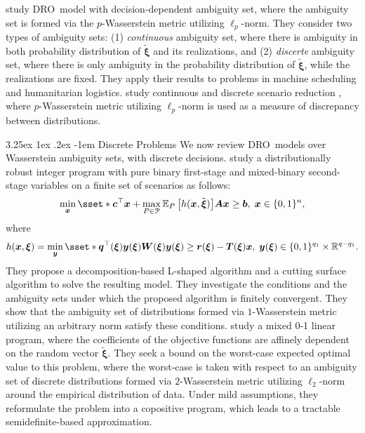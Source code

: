 \documentclass[final,onefignum,onetabnum]{class}
\makeatletter
\renewcommand\paragraph{\@startsection{paragraph}{4}{\z@}%
  {3.25ex \@plus1ex \@minus.2ex}%
  {-1em}%
  {\normalfont\normalsize\bfseries}}
\newcommand{\ee}[2]{\mathbb{E}_{#1} \left[ #2 \right]}
\newcommand{\bs}[1]{\boldsymbol{#1}} %
\newcommand{\Bs}[1]{\mathbb{#1}} %
\newcommand{\Cs}[1]{\mathcal{#1}} %
\newcommand{\txi}{\tilde{\bs{\xi}}}
\newcommand{\dro}{DRO}
\makeatother
\begin{document}
\citet{noyan2018} study \dro\ model with decision-dependent ambiguity set, where the ambiguity set is formed via the $p$-Wasserstein metric utilizing $\ell_{p}$-norm. They consider two types of ambiguity sets: (1) {\it continuous} ambiguity set, where there is ambiguity in both probability distribution of $\txi$ and its realizations, and (2) {\it discerte} ambiguity set, where there is only ambiguity in the probability distribution of $\txi$, while the realizations are fixed.
They apply their results to problems in machine scheduling and humanitarian logistics. 
\citet{rujeerapaiboon2018reduction} study continuous and discrete scenario reduction \citep{dupavcova2003scenario,heitsch2003scenario,heitsch2009modeling,heitsch2009reduction,arpon2018}, where  
$p$-Wasserstein metric utilizing $\ell_{p}$-norm is used as a measure of discrepancy between distributions.


\paragraph{Discrete Problems}
We now review \dro\ models over Wasserstein ambiguity sets, with discrete decisions. 
\citet{bansal2018} study a distributionally robust integer program with  pure binary first-stage and mixed-binary second-stage variables  on a finite set of scenarios as follows:
\begin{equation*}
    \min_{\bs{x}}\sset*{\bs{c}^{\top}\bs{x} +\max_{P \in \Cs{P}} \ee{P}{h(\bs{x}, \txi)}}{\bs{A}\bs{x} \ge \bs{b}, \; \bs{x} \in \{0,1\}^{n}},
\end{equation*}
where 
\begin{equation*}
    h(\bs{x},\bs{\xi})=\min_{\bs{y}}\sset*{\bs{q}^{\top}(\bs{\xi})\bs{y}(\bs{\xi})}{\bs{W}(\bs{\xi})\bs{y}(\bs{\xi}) \ge \bs{r}(\bs{\xi}) - \bs{T}(\bs{\xi}) \bs{x}, \; \bs{y}(\bs{\xi}) \in \{0,1\}^{q_{1}} \times \Bs{R}^{q-q_{1}}}.
\end{equation*}
They propose a  decomposition-based L-shaped algorithm and a cutting surface algorithm to solve the resulting model. They investigate the conditions and the ambiguity sets under which the proposed algorithm is finitely convergent. They show that the ambiguity set of distributions formed via $1$-Wasserstein metric utilizing an arbitrary norm satisfy these conditions. 
\citet{xu2018mip} study a mixed 0-1
linear program, where the coefficients of the objective functions are affinely dependent on the random vector $\txi$. They seek a bound on the worst-case expected optimal value to this problem, where the worst-case is taken with respect to an ambiguity set of discrete distributions formed via $2$-Wasserstein metric utilizing $\ell_{2}$-norm around the empirical distribution of data. Under mild
assumptions, they reformulate the problem into a copositive program, which 
leads to a tractable semidefinite-based approximation.
\end{document}
